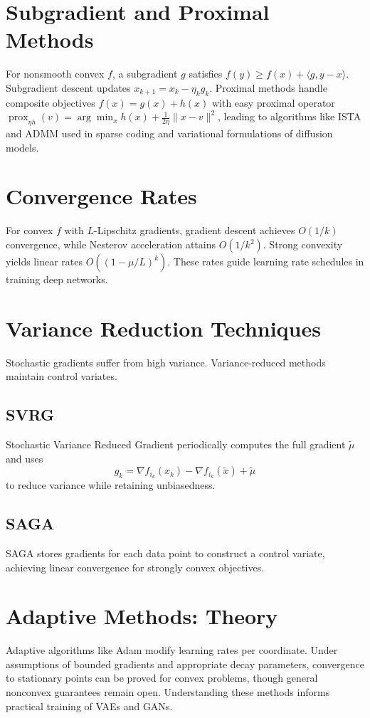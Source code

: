 \section{Subgradient and Proximal Methods}
For nonsmooth convex $f$, a subgradient $g$ satisfies $f(y)\ge f(x)+\langle g,y-x\rangle$. Subgradient descent updates $x_{k+1}=x_k-\eta_k g_k$. Proximal methods handle composite objectives $f(x)=g(x)+h(x)$ with easy proximal operator $\operatorname{prox}_{\eta h}(v)=\arg\min_x h(x)+\tfrac1{2\eta}\|x-v\|^2$, leading to algorithms like ISTA and ADMM used in sparse coding and variational formulations of diffusion models.

\section{Convergence Rates}
For convex $f$ with $L$-Lipschitz gradients, gradient descent achieves $O(1/k)$ convergence, while Nesterov acceleration attains $O(1/k^2)$. Strong convexity yields linear rates $O((1-\mu/L)^k)$. These rates guide learning rate schedules in training deep networks.

\section{Variance Reduction Techniques}
Stochastic gradients suffer from high variance. Variance-reduced methods maintain control variates.
\subsection{SVRG \cite{johnson2013}}
Stochastic Variance Reduced Gradient periodically computes the full gradient $\tilde{\mu}$ and uses
\begin{equation}
g_k=\nabla f_{i_k}(x_k)-\nabla f_{i_k}(\tilde{x})+\tilde{\mu}
\end{equation}
to reduce variance while retaining unbiasedness.
\subsection{SAGA \cite{defazio2014}}
SAGA stores gradients for each data point to construct a control variate, achieving linear convergence for strongly convex objectives.

\section{Adaptive Methods: Theory}
Adaptive algorithms like Adam modify learning rates per coordinate. Under assumptions of bounded gradients and appropriate decay parameters, convergence to stationary points can be proved for convex problems, though general nonconvex guarantees remain open. Understanding these methods informs practical training of VAEs and GANs.


